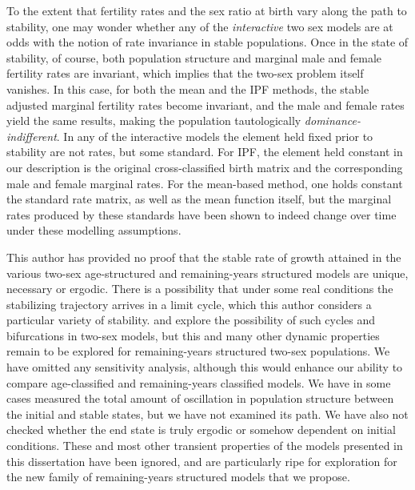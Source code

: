 To the extent that fertility rates and the sex ratio at
birth vary along the path to stability, one may wonder whether any of the
\textit{interactive} two sex models are at odds with the notion of
rate invariance in stable populations. Once in the state of stability, of
course, both population structure and marginal male and female fertility rates are invariant, which
implies that the two-sex problem itself vanishes. In this case, for both the
mean and the IPF methods, the stable adjusted marginal fertility rates become
invariant, and the male and female rates yield the same results, making the
population tautologically \textit{dominance-indifferent}. In any of the
interactive models the element held fixed prior to stability are not rates, but
some standard. For IPF, the element held constant in our 
description is the original cross-classified birth matrix and the corresponding 
male and female marginal rates. For the mean-based method, one holds constant 
the standard rate matrix, as well as the mean function itself, but the marginal 
rates produced by these standards have been shown to indeed change over time
under these modelling assumptions.

This author has provided no proof that the stable rate of growth
attained in the various two-sex age-structured and remaining-years structured
models are unique, necessary or ergodic. There is a possibility that under some
real conditions the stabilizing trajectory arrives in a limit cycle, which this
author considers a particular variety of stability. \citet{wijewickrema1980weak}
and \citet{chung1990phd, chung1994cycles} explore the possibility of such cycles
and bifurcations in two-sex models, but this and many other dynamic
properties remain to be explored for remaining-years structured two-sex
populations. We have omitted any sensitivity analysis, although this would
enhance our ability to compare age-classified and remaining-years
classified models. We have in some cases measured the total amount of
oscillation in population structure between the initial and stable states, but
we have not examined its path. We have also not checked whether the end state
is truly ergodic or somehow dependent on initial conditions. These and most
other transient properties of the models presented in this dissertation have
been ignored, and are particularly ripe for exploration for the new family of
remaining-years structured models that we propose.


